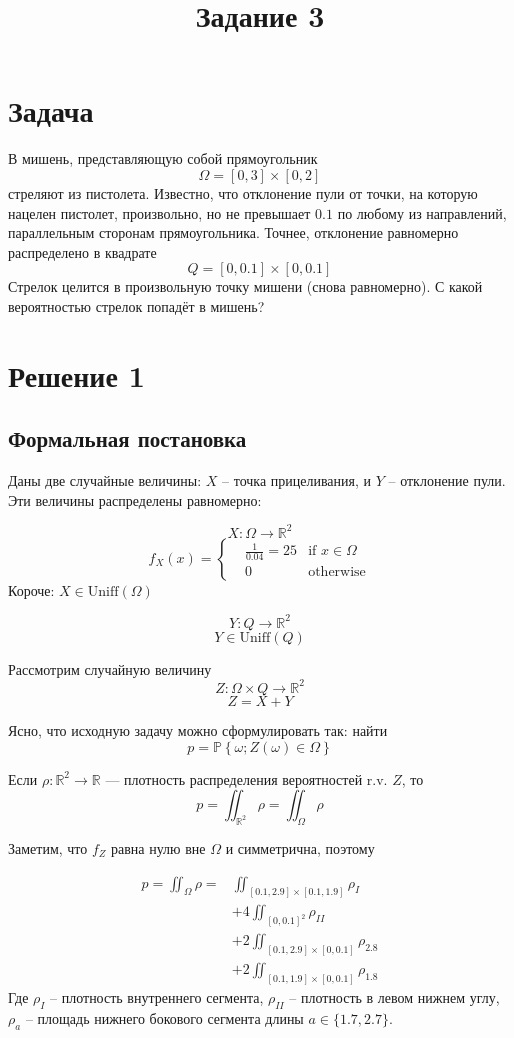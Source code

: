 \documentclass{article}
\title{Задание 3}
\providecommand{\RR}{\mathbb{R}}
\begin{document}
\section{Задача}
В мишень, представляющую собой прямоугольник \[ \Omega = [0,3]\times [0,2] \]
стреляют из пистолета.
Известно, что отклонение пули от точки, на которую нацелен пистолет, произвольно,
но не превышает \( 0.1 \) по любому из направлений,
параллельным сторонам прямоугольника.
Точнее, отклонение равномерно распределено в квадрате \[ Q = [0,0.1]\times [0,0.1] \]
Стрелок целится в произвольную точку мишени (снова равномерно).
С какой вероятностью стрелок попадёт в мишень?
\section{Решение 1}
\subsection{Формальная постановка}
Даны две случайные величины:
\( X \) -- точка прицеливания, и \( Y \) -- отклонение пули.
Эти величины распределены равномерно:

\[ X: \Omega\to\RR^2 \]
\[ f_X(x) =
\left\{\begin{aligned}
    & \frac{1}{0.04} = 25 & \text{if } x\in\Omega \\
    & 0 & \text{otherwise}
\end{aligned}\right. \]
Короче: \( X\in\mathrm{Uniff}(\Omega) \)

\[ Y: Q\to \RR^2 \]
\[ Y\in\mathrm{Uniff}(Q) \]

Рассмотрим случайную величину
\[ Z: \Omega\times Q \to \RR^2 \]
\[ Z = X + Y \]

Ясно, что исходную задачу можно сформулировать так:
найти
\[ p = \mathbb{P}\left\{ \omega; Z(\omega)\in\Omega \right\} \]


Если \( \rho: \RR^2\to\RR \) --- плотность распределения вероятностей r.v. \( Z \), то
\[ p = \iint_{\RR^2} \rho = \iint_\Omega \rho \]

Заметим, что \( f_Z \) равна нулю вне \( \Omega \) и симметрична, поэтому

\begin{align*}
    p = \iint_\Omega \rho = &\iint_{[0.1,2.9]\times [0.1,1.9]} \rho_I  \\
    & + 4\iint_{[0,0.1]^2} \rho_{II} \\
    & + 2\iint_{[0.1,2.9]\times [0,0.1]} \rho_{2.8} \\
    & + 2\iint_{[0.1,1.9]\times [0,0.1]} \rho_{1.8}
\end{align*}
Где \( \rho_I \) -- плотность внутреннего сегмента,
\( \rho_{II} \) -- плотность в левом нижнем углу,
\( \rho_{a} \) -- площадь нижнего бокового сегмента длины \( a \in \{1.7, 2.7\} \).
\end{document}
